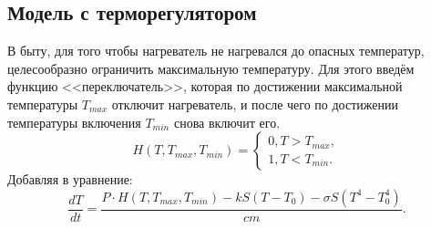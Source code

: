     \subsection{Модель с терморегулятором}
        В быту, для того чтобы нагреватель не нагревался до опасных температур, целесообразно ограничить максимальную температуру. Для этого введём функцию <<переключатель>>, которая по достижении максимальной температуры $ T_{max} $ отключит нагреватель, и после чего по достижении температуры включения $ T_{min} $ снова включит его.
        \[
            H(T, T_{max}, T_{min}) = \begin{cases}
                0, T > T_{max},\\
                1, T < T_{min}.
            \end{cases}
        \]
        Добавляя в уравнение:
        \[
            \frac{dT}{dt} = \frac{ P \cdot H(T, T_{max}, T_{min}) - k S (T - T_0) - \sigma S (T^4 - T_0^4) }{cm}.
        \]